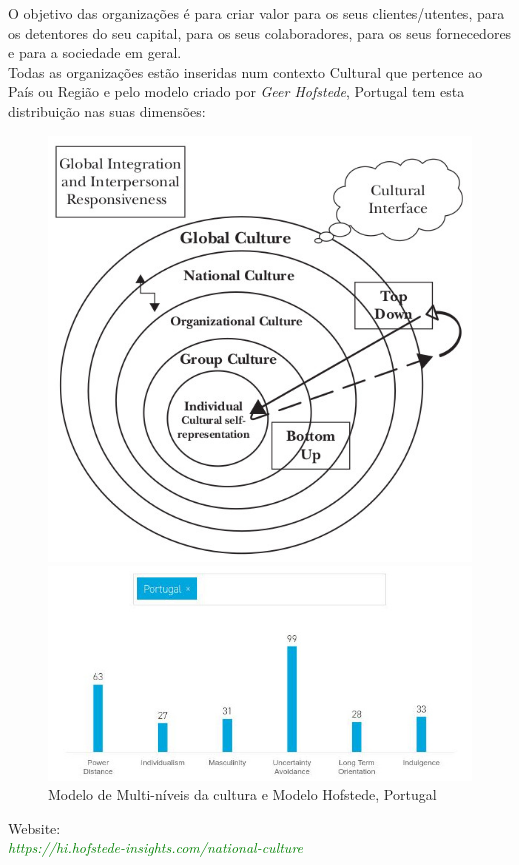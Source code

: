 {O objetivo das organizações é para criar valor para os seus clientes/utentes, para os detentores do seu capital, para os seus colaboradores, para os seus fornecedores e para a sociedade em geral.\\
\newpage
Todas as organizações estão inseridas num contexto Cultural que pertence ao País ou Região e pelo modelo criado por \textit{Geer Hofstede}, Portugal tem esta distribuição nas suas dimensões:
\begin{figure}[H]
\begin{minipage}{0.3\linewidth}
\flushleft
\includegraphics[scale=0.30]{./image/OB/OB_MUltilevelmodelCulture.jpg}
\end{minipage}
\hspace{1cm}
\begin{minipage}{0.4\linewidth}
\flushleft
\includegraphics[scale=0.44]{./image/OB/Hofstede_pt}
\end{minipage}
\caption{Modelo de Multi-níveis da cultura e Modelo Hofstede, Portugal}
\end{figure}
Website:\\
\textit{\textcolor{green}{https://hi.hofstede-insights.com/national-culture}}\\



}
